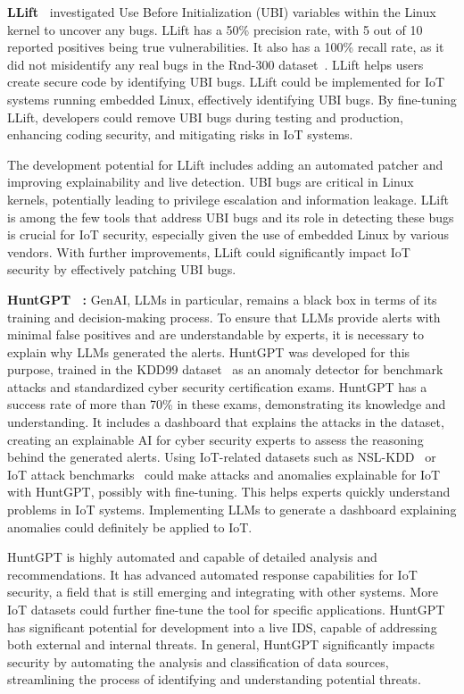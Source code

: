 \smallskip
\noindent \textbf{LLift~\citet{libugdetection2024}} investigated Use Before Initialization (UBI) variables within the Linux kernel to uncover any bugs.
LLift has a 50\% precision rate, with 5 out of 10 reported positives being true vulnerabilities.
It also has a 100\% recall rate, as it did not misidentify any real bugs in the Rnd-300 dataset~\citet{li_2024_10780591}.
LLift helps users create secure code by identifying UBI bugs.
LLift could be implemented for IoT systems running embedded Linux, effectively identifying UBI bugs.
By fine-tuning LLift, developers could remove UBI bugs during testing and production, enhancing coding security, and mitigating risks in IoT systems.

The development potential for LLift includes adding an automated patcher and improving explainability and live detection.
UBI bugs are critical in Linux kernels, potentially leading to privilege escalation and information leakage.
LLift is among the few tools that address UBI bugs and its role in detecting these bugs is crucial for IoT security, especially given the use of embedded Linux by various vendors.
With further improvements, LLift could significantly impact IoT security by effectively patching UBI bugs.

\smallskip
\noindent\textbf{HuntGPT~\citet{ali2023huntgpt} : } GenAI, LLMs in particular, remains a black box in terms of its training and decision-making process.
To ensure that LLMs provide alerts with minimal false positives and are understandable by experts, it is necessary to explain why LLMs generated the alerts.
HuntGPT was developed for this purpose, trained in the KDD99 dataset~\citet{kdd99dataset} as an anomaly detector for benchmark attacks and standardized cyber security certification exams.
HuntGPT has a success rate of more than 70\% in these exams, demonstrating its knowledge and understanding.
It includes a dashboard that explains the attacks in the dataset, creating an explainable AI for cyber security experts to assess the reasoning behind the generated alerts.
Using IoT-related datasets such as NSL-KDD~\citet{nslkdd2009} or IoT attack benchmarks~\citet{iotattackbenchmark} could make attacks and anomalies explainable for IoT with HuntGPT, possibly with fine-tuning.
This helps experts quickly understand problems in IoT systems.
Implementing LLMs to generate a dashboard explaining anomalies could definitely be applied to IoT.

HuntGPT is highly automated and capable of detailed analysis and recommendations.
It has advanced automated response capabilities for IoT security, a field that is still emerging and integrating with other systems.
More IoT datasets could further fine-tune the tool for specific applications.
HuntGPT has significant potential for development into a live IDS, capable of addressing both external and internal threats.
In general, HuntGPT significantly impacts security by automating the analysis and classification of data sources, streamlining the process of identifying and understanding potential threats.
%
